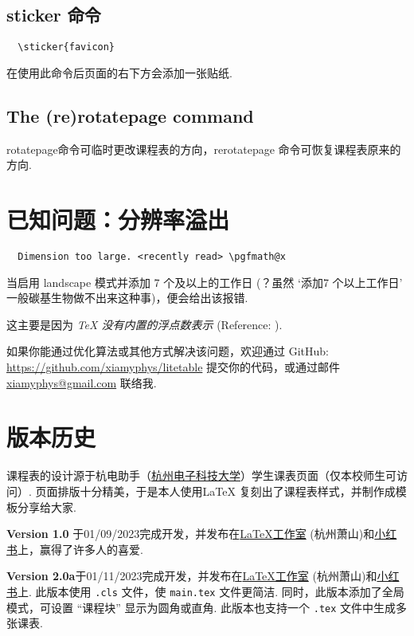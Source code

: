 \documentclass[11pt]{article}
\def\mode#1{\texorpdfstring{\textcolor{moducolor}{\textsf{#1}}}{“#1”}}
\def\cmd#1{\texorpdfstring{\textcolor{cmdcolor}{\textsf{#1}}}{“#1”}}
\begin{document}
\subsection{\cmd{sticker} 命令}
\begin{verbatim}
  \sticker{favicon}
\end{verbatim}
在使用此命令后页面的右下方会添加一张贴纸.

\subsection{The \cmd{(re)rotatepage} command}
\cmd{rotatepage}命令可临时更改课程表的方向，\cmd{rerotatepage} 命令可恢复课程表原来的方向.

\section{已知问题：分辨率溢出}
\begin{verbatim}
  Dimension too large. <recently read> \pgfmath@x
\end{verbatim}

当启用 \mode{landscape} 模式并添加 7 个及以上的工作日 (？虽然 `添加7 个以上工作日' 一般碳基生物做不出来这种事)，便会给出该报错.

这主要是因为 \emph{\textsf{\TeX} 没有内置的浮点数表示} (Reference: ).

如果你能通过优化算法或其他方式解决该问题，欢迎通过 GitHub: \url{https://github.com/xiamyphys/litetable} 提交你的代码，或通过邮件 \href{mail:xiamyphys@gmail.com}{\ttfamily xiamyphys@gmail.com} 联络我.

\section{版本历史}

课程表的设计源于杭电助手（\href{https://www.hdu.edu.cn}{杭州电子科技大学}）学生课表页面（仅本校师生可访问）. 页面排版十分精美，于是本人使用\LaTeX{} 复刻出了课程表样式，并制作成模板分享给大家.

\textsf{\bfseries Version 1.0} 于01/09/2023完成开发，并发布在\href{https://www.latexstudio.net/index/details/index/mid/3625.html}{\LaTeX{}工作室} (杭州萧山)和\href{http://xhslink.com/od7Ycw}{小红书}上，赢得了许多人的喜爱.

\textsf{\bfseries Version 2.0a}于01/11/2023完成开发，并发布在\href{https://www.latexstudio.net/index/details/index/mid/3636.html}{\LaTeX{}工作室} (杭州萧山)和\href{http://xhslink.com/od7Ycw}{小红书}上. 此版本使用 \verb|.cls| 文件，使 \verb|main.tex| 文件更简洁. 同时，此版本添加了全局模式，可设置 ``课程块'' 显示为圆角或直角. 此版本也支持一个 \verb|.tex| 文件中生成多张课表.
\end{document}
